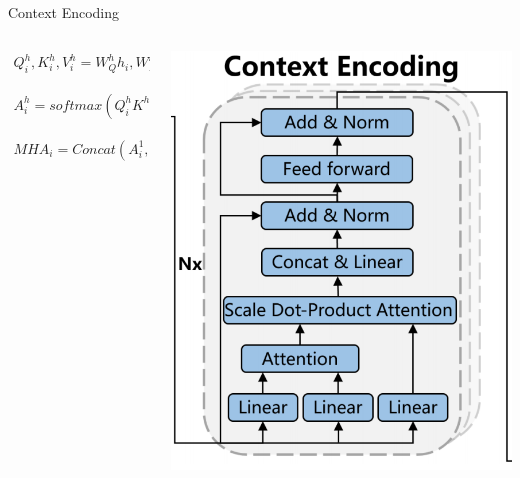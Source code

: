 \documentclass{beamer}
\begin{document}
\begin{frame}{Context Encoding}
	\begin{columns}
		\begin{column}{0.6\textwidth}
			\footnotesize
			\begin{align}
				Q_i^h,K_i^h,V_i^h=W_Q^hh_i,W_K^hh_i,W_V^hh_i,
			\end{align}

			\begin{align}
				A_i^h=softmax(Q_i^h{K^h}^T/\sqrt{d_k})V_j^h,
			\end{align}

			\begin{align}
				MHA_i=Concat(A_i^1,A_i^2,...,A_i^H)W_O,
			\end{align}
		\end{column}
		\begin{column}{0.4\textwidth}
			\centering
			\includegraphics[width=\textwidth]{CE.png} %
		\end{column}
	\end{columns}

\end{frame}
\end{document}
